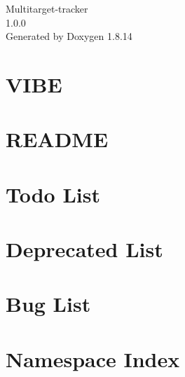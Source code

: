 \documentclass[twoside]{book}
\newcommand{\+}{\discretionary{\mbox{\scriptsize$\hookleftarrow$}}{}{}}
\newcommand{\clearemptydoublepage}{%
  \newpage{\pagestyle{empty}\cleardoublepage}%
}
\begin{document}
\hypersetup{pageanchor=false,
             bookmarksnumbered=true,
             pdfencoding=unicode
            }
\begin{titlepage}
\vspace*{7cm}
\begin{center}%
{\Large Multitarget-\/tracker \\[1ex]\large 1.\+0.\+0 }\\
\vspace*{1cm}
{\large Generated by Doxygen 1.8.14}\\
\end{center}
\end{titlepage}
\clearemptydoublepage
{}
\tableofcontents
\clearemptydoublepage
{}
\hypersetup{pageanchor=true}

\chapter{V\+I\+BE}
\label{md__d_1__roy__git_hub__multitarget-tracker__detector_vibe_src__r_e_a_d_m_e}

\chapter{R\+E\+A\+D\+ME}
\label{md__d_1__roy__git_hub__multitarget-tracker__r_e_a_d_m_e}

\chapter{Todo List}
\label{todo}

\chapter{Deprecated List}
\label{deprecated}

\chapter{Bug List}
\label{bug}

\chapter{Namespace Index}

\end{document}
